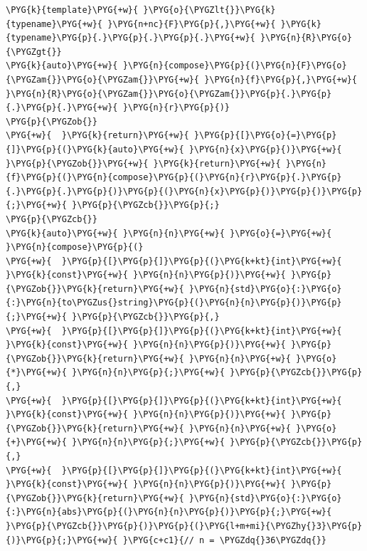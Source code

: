 \begin{itemize}
\begin{codeblockbg}
\begin{Verbatim}[commandchars=\\\{\},breaklines=true,breakanywhere=true,fontsize=\codefont,xleftmargin=17bp]
\PYG{k}{template}\PYG{+w}{ }\PYG{o}{\PYGZlt{}}\PYG{k}{typename}\PYG{+w}{ }\PYG{n+nc}{F}\PYG{p}{,}\PYG{+w}{ }\PYG{k}{typename}\PYG{p}{.}\PYG{p}{.}\PYG{p}{.}\PYG{+w}{ }\PYG{n}{R}\PYG{o}{\PYGZgt{}}
\PYG{k}{auto}\PYG{+w}{ }\PYG{n}{compose}\PYG{p}{(}\PYG{n}{F}\PYG{o}{\PYGZam{}}\PYG{o}{\PYGZam{}}\PYG{+w}{ }\PYG{n}{f}\PYG{p}{,}\PYG{+w}{ }\PYG{n}{R}\PYG{o}{\PYGZam{}}\PYG{o}{\PYGZam{}}\PYG{p}{.}\PYG{p}{.}\PYG{p}{.}\PYG{+w}{ }\PYG{n}{r}\PYG{p}{)}
\PYG{p}{\PYGZob{}}
\PYG{+w}{  }\PYG{k}{return}\PYG{+w}{ }\PYG{p}{[}\PYG{o}{=}\PYG{p}{]}\PYG{p}{(}\PYG{k}{auto}\PYG{+w}{ }\PYG{n}{x}\PYG{p}{)}\PYG{+w}{ }\PYG{p}{\PYGZob{}}\PYG{+w}{ }\PYG{k}{return}\PYG{+w}{ }\PYG{n}{f}\PYG{p}{(}\PYG{n}{compose}\PYG{p}{(}\PYG{n}{r}\PYG{p}{.}\PYG{p}{.}\PYG{p}{.}\PYG{p}{)}\PYG{p}{(}\PYG{n}{x}\PYG{p}{)}\PYG{p}{)}\PYG{p}{;}\PYG{+w}{ }\PYG{p}{\PYGZcb{}}\PYG{p}{;}
\PYG{p}{\PYGZcb{}}
\PYG{k}{auto}\PYG{+w}{ }\PYG{n}{n}\PYG{+w}{ }\PYG{o}{=}\PYG{+w}{ }\PYG{n}{compose}\PYG{p}{(}
\PYG{+w}{  }\PYG{p}{[}\PYG{p}{]}\PYG{p}{(}\PYG{k+kt}{int}\PYG{+w}{ }\PYG{k}{const}\PYG{+w}{ }\PYG{n}{n}\PYG{p}{)}\PYG{+w}{ }\PYG{p}{\PYGZob{}}\PYG{k}{return}\PYG{+w}{ }\PYG{n}{std}\PYG{o}{:}\PYG{o}{:}\PYG{n}{to\PYGZus{}string}\PYG{p}{(}\PYG{n}{n}\PYG{p}{)}\PYG{p}{;}\PYG{+w}{ }\PYG{p}{\PYGZcb{}}\PYG{p}{,}
\PYG{+w}{  }\PYG{p}{[}\PYG{p}{]}\PYG{p}{(}\PYG{k+kt}{int}\PYG{+w}{ }\PYG{k}{const}\PYG{+w}{ }\PYG{n}{n}\PYG{p}{)}\PYG{+w}{ }\PYG{p}{\PYGZob{}}\PYG{k}{return}\PYG{+w}{ }\PYG{n}{n}\PYG{+w}{ }\PYG{o}{*}\PYG{+w}{ }\PYG{n}{n}\PYG{p}{;}\PYG{+w}{ }\PYG{p}{\PYGZcb{}}\PYG{p}{,}
\PYG{+w}{  }\PYG{p}{[}\PYG{p}{]}\PYG{p}{(}\PYG{k+kt}{int}\PYG{+w}{ }\PYG{k}{const}\PYG{+w}{ }\PYG{n}{n}\PYG{p}{)}\PYG{+w}{ }\PYG{p}{\PYGZob{}}\PYG{k}{return}\PYG{+w}{ }\PYG{n}{n}\PYG{+w}{ }\PYG{o}{+}\PYG{+w}{ }\PYG{n}{n}\PYG{p}{;}\PYG{+w}{ }\PYG{p}{\PYGZcb{}}\PYG{p}{,}
\PYG{+w}{  }\PYG{p}{[}\PYG{p}{]}\PYG{p}{(}\PYG{k+kt}{int}\PYG{+w}{ }\PYG{k}{const}\PYG{+w}{ }\PYG{n}{n}\PYG{p}{)}\PYG{+w}{ }\PYG{p}{\PYGZob{}}\PYG{k}{return}\PYG{+w}{ }\PYG{n}{std}\PYG{o}{:}\PYG{o}{:}\PYG{n}{abs}\PYG{p}{(}\PYG{n}{n}\PYG{p}{)}\PYG{p}{;}\PYG{+w}{ }\PYG{p}{\PYGZcb{}}\PYG{p}{)}\PYG{p}{(}\PYG{l+m+mi}{\PYGZhy{}3}\PYG{p}{)}\PYG{p}{;}\PYG{+w}{ }\PYG{c+c1}{// n = \PYGZdq{}36\PYGZdq{}}
\end{Verbatim}
\end{codeblockbg}

\end{itemize}


